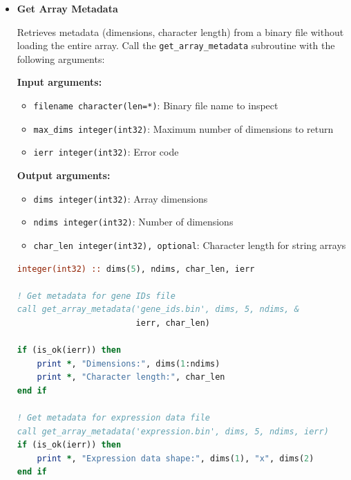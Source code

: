 \documentclass[11pt]{article}
\begin{document}
\begin{enumerate}
\begin{itemize}
\begin{lstlisting}[language=Fortran, caption={Load Shift Vectors}]
call load_shift_vectors(loaded_shifts, 'shift_vectors.bin', ierr)
	      	      \end{lstlisting}
	      	      
	      	\item \textbf{Get Array Metadata}
	      	      
	      	      Retrieves metadata (dimensions, character length) from a binary file
	      	      without loading the entire array. Call the \texttt{get\_array\_metadata}
	      	      subroutine with the following arguments:
	      	      
	      	      \textbf{Input arguments:}
	      	      \begin{itemize}
	      	      	\item \texttt{filename character(len=*)}: Binary file name to inspect
	      	      	      
	      	      	\item \texttt{max\_dims integer(int32)}: Maximum number of dimensions
	      	      	      to return
	      	      	      
	      	      	\item \texttt{ierr integer(int32)}: Error code
	      	      \end{itemize}
	      	      \textbf{Output arguments:}
	      	      \begin{itemize}
	      	      	\item \texttt{dims integer(int32)}: Array dimensions
	      	      	      
	      	      	\item \texttt{ndims integer(int32)}: Number of dimensions
	      	      	      
	      	      	\item \texttt{char\_len integer(int32), optional}: Character length for
	      	      	      string arrays
	      	      \end{itemize}
	      	      \begin{lstlisting}[language=Fortran, caption={Inspect Array File Metadata}]
integer(int32) :: dims(5), ndims, char_len, ierr

! Get metadata for gene IDs file
call get_array_metadata('gene_ids.bin', dims, 5, ndims, &
                        ierr, char_len)

if (is_ok(ierr)) then
    print *, "Dimensions:", dims(1:ndims)
    print *, "Character length:", char_len
end if

! Get metadata for expression data file
call get_array_metadata('expression.bin', dims, 5, ndims, ierr)
if (is_ok(ierr)) then
    print *, "Expression data shape:", dims(1), "x", dims(2)
end if
	      	      \end{lstlisting}
	      	      

\end{itemize}
\end{enumerate}
\end{document}
